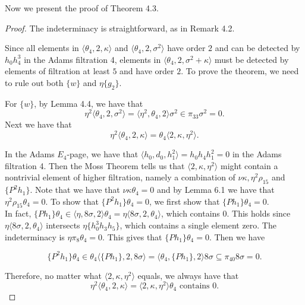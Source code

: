 \documentclass[psamsfonts]{amsart}
\theoremstyle{definition}
\numberwithin{equation}{section}
\begin{document}


Now we present the proof of Theorem 4.3.

\begin{proof}
The indeterminacy is straightforward, as in Remark 4.2.

Since all elements in $\langle \theta_4, 2, \kappa\rangle$ and $\langle \theta_4, 2, \sigma^2\rangle$ have order $2$ and can be detected by $h_0h_4^3$ in the Adams filtration 4, elements in $\langle \theta_4, 2, \sigma^2+\kappa\rangle$ must be detected by elements of filtration at least $5$ and have order $2$. To prove the theorem, we need to rule out both $\{w\}$ and $\eta\{g_2\}$.

For $\{w\}$, by Lemma 4.4, we have that
$$\eta^2 \langle\theta_4, 2, \sigma^2\rangle  =  \langle\eta^2, \theta_4, 2\rangle \sigma^2 \in \pi_{33} \sigma^2 = 0.$$
Next we have that
$$\eta^2 \langle\theta_4, 2, \kappa\rangle  =  \theta_4 \langle 2, \kappa, \eta^2\rangle.$$

In the Adams $E_4$-page, we have that $\langle h_0, d_0, h_1^2\rangle= h_0h_4h_1^2 =0$ in the Adams filtration 4. Then the Moss Theorem tells us that $\langle 2,\kappa,\eta^2\rangle$ might contain a nontrivial element of higher filtration, namely a combination of $\nu\kappa, \eta^2\rho_{15}$ and $\{P^2h_1\}$. Note that we have that $\nu\kappa\theta_4=0$ and by Lemma 6.1 we have that $\eta^2\rho_{15}\theta_4=0$. To show that $\{P^2h_1\}\theta_4=0$, we first show that $\{Ph_1\}\theta_4=0$.\\

In fact, $\{Ph_1\}\theta_4\in \langle\eta,8\sigma, 2\rangle\theta_4 = \eta \langle 8\sigma, 2, \theta_4\rangle$, which contains $0$. This holds since $\eta \langle 8\sigma, 2, \theta_4\rangle$ intersects $\eta\{h_0^3h_3h_5\}$, which contains a single element zero. The indeterminacy is $\eta \pi_8 \theta_4 =0$. This gives that $\{Ph_1\}\theta_4=0$. Then we have

$$\{P^2h_1\}\theta_4 \in \theta_4 \langle \{Ph_1\}, 2, 8\sigma\rangle=\langle\theta_4, \{Ph_1\}, 2\rangle 8\sigma \subseteq \pi_{40} 8 \sigma=0.$$

Therefore, no matter what $\langle 2,\kappa,\eta^2\rangle$ equals, we always have that
$$\eta^2 \langle\theta_4, 2, \kappa\rangle  = \langle 2,\kappa, \eta^2\rangle\theta_4 \text{~contains~}0.$$


\end{proof}
\end{document}
